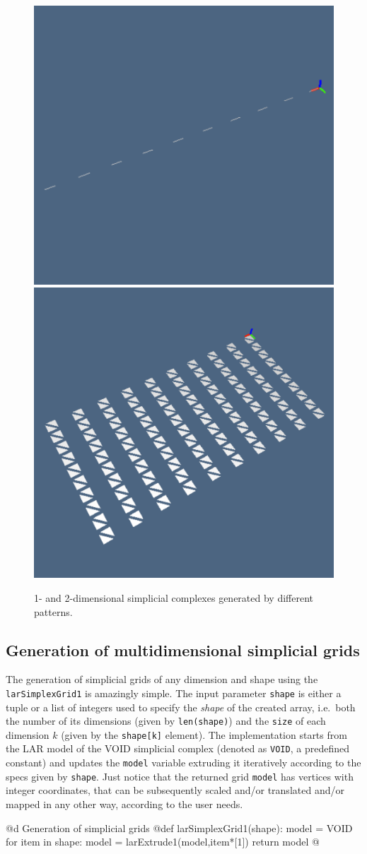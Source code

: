 \documentclass[11pt,oneside]{article}	%
\begin{document}
\begin{figure}[htbp] %
   \centering
   \includegraphics[height=0.25\linewidth,width=0.25\linewidth]{images/simplexn-2a} 
   \includegraphics[height=0.25\linewidth,width=0.25\linewidth]{images/simplexn-2b} 
   \caption{1- and 2-dimensional simplicial complexes generated by different patterns.}
   \label{fig:example}
\end{figure}


\subsection{Generation of multidimensional simplicial grids}

The generation of simplicial grids of any dimension and shape using the \texttt{larSimplexGrid1}
is amazingly simple. The input parameter \texttt{shape} is either a tuple or a list of integers used to specify the \emph{shape} of the created array, i.e.~both the number of its dimensions (given by \texttt{len(shape)}) and the \texttt{size} of each dimension $k$ (given by the \texttt{shape[k]} element).
The implementation starts from the LAR model of the VOID simplicial complex (denoted as \texttt{VOID}, a predefined constant) and updates the \texttt{model} variable extruding it iteratively according to the specs given by \texttt{shape}.
Just notice that the returned grid \texttt{model} has vertices with integer coordinates, that can be subsequently scaled and/or translated and/or mapped in any other way, according to the user needs.

@d Generation of simplicial grids
@{def larSimplexGrid1(shape):
    model = VOID
    for item in shape:
        model = larExtrude1(model,item*[1])
    return model
@}
\end{document}
